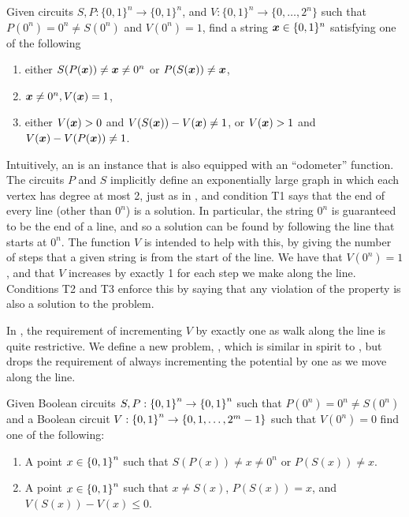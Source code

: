 \begin{definition}
Given circuits $S,P: \{0,1\}^n \rightarrow \{0,1\}^n$, and $V:\{0,1\}^n\rightarrow \{0,\dots, 2^n\}$ such that $P(0^n) =0^n\neq S(0^n)$ and $V(0^n)=1$, find a string $\mbox{\boldmath $x$} \in \{0,1\}^n$ satisfying one of the following 
\begin{enumerate}[label=(T\arabic*)]
\item either $S(P(\mbox{\boldmath $x$}))\neq \mbox{\boldmath $x$} \neq 0^n$ or $P(S(\mbox{\boldmath $x$}))\neq \mbox{\boldmath $x$}$,
\item $\mbox{\boldmath $x$}\neq 0^n, V(\mbox{\boldmath $x$})=1$,
\item either $V(\mbox{\boldmath $x$})>0$ and $V(S(\mbox{\boldmath $x$}))-V(\mbox{\boldmath $x$})\neq 1$, or $V(\mbox{\boldmath $x$})>1$ and $V(\mbox{\boldmath $x$})-V(P(\mbox{\boldmath $x$}))\neq 1$. 
\end{enumerate}
\end{definition}
Intuitively, an \EOML is an \EOL instance that is also equipped with an
``odometer'' function. The circuits $P$ and $S$ implicitly define an
exponentially large graph in which each vertex has degree at most 2, just as in \EOL, and condition T1 says that the end of
every line (other than $0^n$) is a solution.
In particular, the string 
$0^n$ is guaranteed to be the end of a line, and so a solution can be found by
following the line that starts at $0^n$.
 The function $V$ is intended to help with this, by giving the number of steps
that a given string is from the start of the line. We have that $V(0^n) = 1$,
and that $V$ increases by exactly 1 for each step we make along the line.
Conditions T2 and T3 enforce this by saying that any violation of the property
is also a solution to the problem. 


In \EOML, the requirement of incrementing $V$ by exactly one as walk along the
line is quite restrictive. We define a new problem, \EOPL,  which is similar in
spirit to \EOL, but drops the requirement of always incrementing the potential
by one as we move along the line.

\begin{definition}[\EOPL]
\label{def:EOPL}
Given Boolean circuits $S,P : \left\{ 0,1 \right\}^n \to \left\{ 0,1 \right\}^n$ such that $P(0^n) =0^n\neq S(0^n)$ and a Boolean circuit $V: \left\{ 0,1 \right\}^n \to \left\{ 0,1,\dotsc,2^m - 1 \right\}$ such that $V(0^n) = 0$ find one of the following:
\begin{enumerate}[label=(R\arabic*)]
\item A point $x \in \left\{ 0,1 \right\}^n$ such that $S(P(x)) \neq x \neq 0^n$ or $P(S(x)) \neq x$.
\item A point $x \in \left\{ 0,1 \right\}^n$ such that $x \neq S(x)$, $P(S(x)) = x$, and $V(S(x)) - V(x) \leq 0$.
\end{enumerate}
\end{definition}


